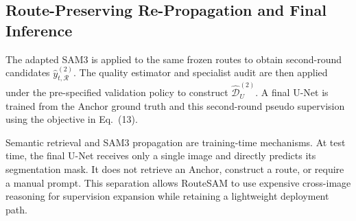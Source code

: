 \documentclass[a4paper,fleqn]{cas-dc}
\begin{document}
\subsection{Route-Preserving Re-Propagation and Final Inference}\label{sec:repropagation}

The adapted SAM3 is applied to the same frozen routes to obtain second-round candidates $\hat{y}_{t,\mathcal{R}}^{(2)}$. The quality estimator and specialist audit are then applied under the pre-specified validation policy to construct $\widehat{\mathcal{D}}_{U}^{(2)}$. A final U-Net is trained from the Anchor ground truth and this second-round pseudo supervision using the objective in Eq.~(13).

Semantic retrieval and SAM3 propagation are training-time mechanisms. At test time, the final U-Net receives only a single image and directly predicts its segmentation mask. It does not retrieve an Anchor, construct a route, or require a manual prompt. This separation allows RouteSAM to use expensive cross-image reasoning for supervision expansion while retaining a lightweight deployment path.

\printcredits

%





\end{document}
